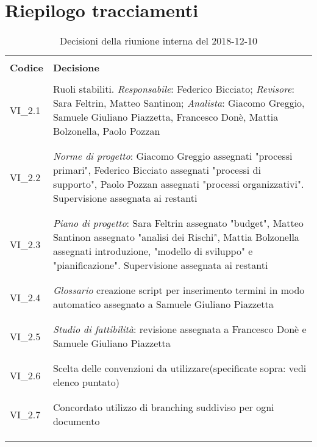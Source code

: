 \section{Riepilogo tracciamenti}
\begin{centering}
\begin{longtable}{ >{\centering}p{4cm} >{\centering}p{11cm} }

\hline
\\[0.5pt]
	\textbf{Codice} & \textbf{Decisione} 
	
	\tabularnewline 
	\hline
	
	
				\\[0.5pt]
				VI\_2.1 & Ruoli stabiliti. \textit{Responsabile}: Federico Bicciato; \textit{Revisore}: Sara Feltrin, Matteo Santinon; \textit{Analista}: Giacomo Greggio, Samuele Giuliano Piazzetta, Francesco Donè, Mattia Bolzonella, Paolo Pozzan
				\\[0.5pt]
				\tabularnewline
				\hline
						
				\\[0.5pt]
				VI\_2.2 & \textit{Norme di progetto}: Giacomo Greggio assegnati "processi primari", Federico Bicciato assegnati "processi di supporto", Paolo Pozzan assegnati "processi organizzativi". Supervisione assegnata ai restanti
				\\[0.5pt]
				\tabularnewline
				\hline
				
				\\[0.5pt]
				VI\_2.3 & \textit{Piano di progetto}: Sara Feltrin assegnato "budget", Matteo Santinon assegnato "analisi dei Rischi", Mattia Bolzonella assegnati introduzione, "modello di sviluppo" e "pianificazione".
				Supervisione assegnata ai restanti
				\\[0.5pt]
				\tabularnewline
				\hline
				
				\\[0.5pt]				
				VI\_2.4 & \textit{Glossario} creazione script per inserimento termini in modo automatico assegnato a Samuele Giuliano Piazzetta
				\\[0.5pt]
				\tabularnewline
				\hline
				
				\\[0.5pt]
				VI\_2.5 & \textit{Studio di fattibilità}: revisione assegnata a Francesco Donè e Samuele Giuliano Piazzetta
				\\[0.5pt]
				\tabularnewline
				\hline
				
				\\[0.5pt]
				VI\_2.6 & Scelta delle convenzioni da utilizzare(specificate sopra: vedi elenco puntato)
				\\[0.5pt]
				\tabularnewline
				\hline
		
				\\[0.5pt]
				VI\_2.7 & Concordato utilizzo di branching suddiviso per ogni documento
				\\[0.5pt]
				\tabularnewline
				\hline          	
                
        \\[0.7pt]
        \caption{Decisioni della riunione interna del 2018-12-10}
\end{longtable}
\end{centering}

